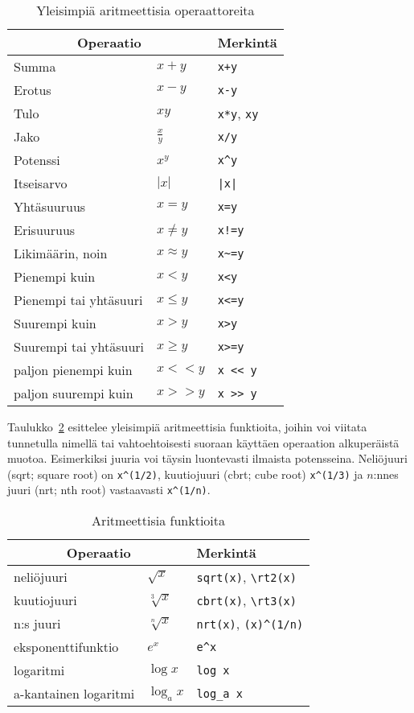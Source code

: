 \begin{table}[H]
\begin{tabular}{ l|l|l }
\multicolumn{2}{c}{Operaatio} & Merkintä \\ \hline
Summa & $x+y$ & \verb$x+y$ \\
Erotus & $x-y$ & \verb$x-y$ \\
Tulo & $x y$ & \verb$x*y$, \verb$xy$ \\
Jako & $\frac{x}{y}$ & \verb$x/y$ \\
Potenssi & $x^y$ & \verb$x^y$ \\
Itseisarvo & $|x|$ & \verb$|x|$ \\
Yhtäsuuruus & $x=y$ & \verb$x=y$ \\
Erisuuruus & $x\neq y$ & \verb$x!=y$ \\
Likimäärin, noin & $x\approx y$ & \verb$x~=y$ \\
Pienempi kuin & $x < y$ & \verb$x<y$ \\
Pienempi tai yhtäsuuri & $x \leq y$ & \verb$x<=y$ \\
Suurempi kuin & $x > y$ & \verb$x>y$ \\
Suurempi tai yhtäsuuri & $x \geq y$ & \verb$x>=y$ \\
paljon pienempi kuin & $x << y$ & \verb$x << y$ \\
paljon suurempi kuin & $x >> y$ & \verb$x >> y$ \\
\end{tabular}
\caption{Yleisimpiä aritmeettisia operaattoreita}
\label{tbl:arithmop}
\end{table}

Taulukko~\ref{tbl:arithmfunc} esittelee yleisimpiä aritmeettisia funktioita, joihin voi viitata tunnetulla nimellä
tai vahtoehtoisesti suoraan käyttäen operaation alkuperäistä muotoa.
Esimerkiksi juuria voi täysin luontevasti ilmaista potensseina. 
Neliöjuuri (sqrt; square root) on \verb$x^(1/2)$, kuutiojuuri (cbrt; cube root) \verb$x^(1/3)$ ja $n$:nnes juuri (nrt; nth root) vastaavasti \verb$x^(1/n)$.

\begin{table}[h!]
\begin{tabular}{ l|l|l }
\multicolumn{2}{c}{Operaatio} & Merkintä \\ \hline
neliöjuuri & $\sqrt{x}$ & \verb$sqrt(x)$, \verb$\rt2(x)$ \\
kuutiojuuri & $\sqrt[3]{x}$ & \verb$cbrt(x)$, \verb$\rt3(x)$ \\
n:s juuri & $\sqrt[n]{x}$ & \verb$nrt(x)$, \verb$(x)^(1/n)$ \\
eksponenttifunktio & $e^x$ & \verb$e^x$ \\
logaritmi & $\log x$ & \verb$log x$ \\
a-kantainen logaritmi & $\log_a x$ & \verb$log_a x$ \\
\end{tabular}
\caption{Aritmeettisia funktioita}
\label{tbl:arithmfunc}
\end{table}

